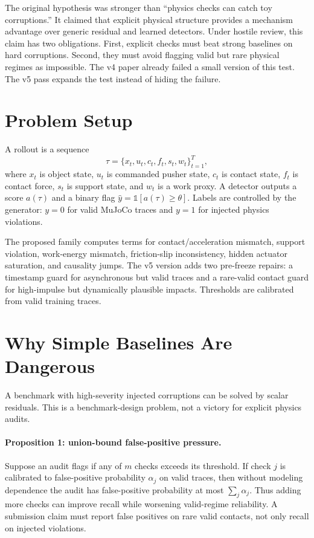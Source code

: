 \documentclass{article}
\begin{document}
The original hypothesis was stronger than ``physics checks can catch toy corruptions.'' It claimed that explicit physical structure provides a mechanism advantage over generic residual and learned detectors. Under hostile review, this claim has two obligations. First, explicit checks must beat strong baselines on hard corruptions. Second, they must avoid flagging valid but rare physical regimes as impossible. The v4 paper already failed a small version of this test. The v5 pass expands the test instead of hiding the failure.

\section{Problem Setup}

A rollout is a sequence
\[
  \tau = \{x_t, u_t, c_t, f_t, s_t, w_t\}_{t=1}^{T},
\]
where $x_t$ is object state, $u_t$ is commanded pusher state, $c_t$ is contact state, $f_t$ is contact force, $s_t$ is support state, and $w_t$ is a work proxy. A detector outputs a score $a(\tau)$ and a binary flag $\hat{y}=\mathbb{1}[a(\tau)\geq \theta]$. Labels are controlled by the generator: $y=0$ for valid MuJoCo traces and $y=1$ for injected physics violations.

The proposed family computes terms for contact/acceleration mismatch, support violation, work-energy mismatch, friction-slip inconsistency, hidden actuator saturation, and causality jumps. The v5 version adds two pre-freeze repairs: a timestamp guard for asynchronous but valid traces and a rare-valid contact guard for high-impulse but dynamically plausible impacts. Thresholds are calibrated from valid training traces.

\section{Why Simple Baselines Are Dangerous}

A benchmark with high-severity injected corruptions can be solved by scalar residuals. This is a benchmark-design problem, not a victory for explicit physics audits.

\paragraph{Proposition 1: union-bound false-positive pressure.}
Suppose an audit flags if any of $m$ checks exceeds its threshold. If check $j$ is calibrated to false-positive probability $\alpha_j$ on valid traces, then without modeling dependence the audit has false-positive probability at most $\sum_j \alpha_j$. Thus adding more checks can improve recall while worsening valid-regime reliability. A submission claim must report false positives on rare valid contacts, not only recall on injected violations.
\end{document}
